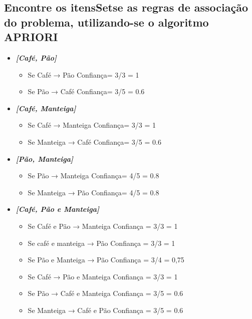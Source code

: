 \documentclass[12pt]{article}
\begin{document}
\subsection{Encontre os itensSetse as regras de associação do problema, utilizando-se o algoritmo APRIORI}

\begin{itemize}
	\item \textbf{\textit{[Café, Pão]}}
	      \begin{itemize}
		      \item Se Café → Pão	Confiança= 3/3 = 1
		      \item Se Pão  → Café	Confiança= 3/5 = 0.6
	      \end{itemize}
	\item \textbf{\textit{[Café, Manteiga]}}
	      \begin{itemize}
		      \item Se Café → Manteiga     Confiança= 3/3 = 1
		      \item Se Manteiga → Café	 Confiança= 3/5 = 0.6
	      \end{itemize}
	\item  \textbf{\textit{[Pão, Manteiga]}}
	      \begin{itemize}
		      \item Se Pão → Manteiga	  Confiança= 4/5 = 0.8
		      \item Se Manteiga → Pão	  Confiança= 4/5 = 0.8
	      \end{itemize}
	\item \textbf{\textit{[Café, Pão e Manteiga]}}
	      \begin{itemize}
		      \item Se Café e Pão → Manteiga	Confiança = 3/3 = 1
		      \item Se café e manteiga → Pão	Confiança = 3/3 = 1
		      \item Se Pão e Manteiga → Pão	Confiança = 3/4 = 0,75
		      \item Se Café → Pão e Manteiga	Confiança = 3/3 = 1
		      \item Se Pão → Café e Manteiga	Confiança = 3/5 = 0.6
		      \item Se Manteiga → Café e Pão 	Confiança = 3/5 = 0.6
	      \end{itemize}


\end{itemize}
\end{document}
